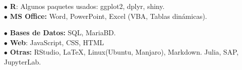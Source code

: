 \documentclass[11pt,a4paper]{article}
\begin{document}
\begin{multicols}{2}

\noindent \textbf{$\bullet$ R}: Algunos paquetes usados: ggplot2, dplyr, shiny.\\[0.1pt]

\noindent \textbf{$\bullet$ MS Office: } Word, PowerPoint, Excel (VBA, Tablas dinámicas). 

\noindent \textbf{$\bullet$ Bases de Datos:} SQL, MariaBD.\\[0.1pt]

\noindent \textbf{$\bullet$ Web}: JavaScript, CSS, HTML\\[0.1pt]


\noindent \textbf{$\bullet$ Otras: }RStudio, LaTeX, Linux(Ubuntu, Manjaro), Markdown. Julia, SAP, JupyterLab.
        
\end{multicols}
\end{document}
